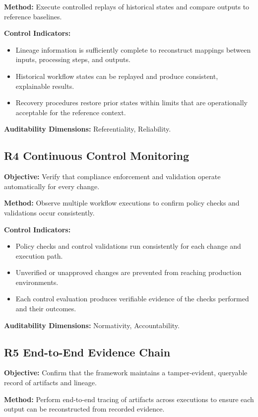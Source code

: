 \textbf{Method:} Execute controlled replays of historical states and compare
outputs to reference baselines.  

\textbf{Control Indicators:}
\begin{itemize}
  \item Lineage information is sufficiently complete to reconstruct mappings
        between inputs, processing steps, and outputs.
  \item Historical workflow states can be replayed and produce consistent,
        explainable results.
  \item Recovery procedures restore prior states within limits that are
        operationally acceptable for the reference context.
\end{itemize}
\textbf{Auditability Dimensions:} Referentiality, Reliability.

\subsection*{R4 Continuous Control Monitoring}
\noindent
\textbf{Objective:} Verify that compliance enforcement and validation operate
automatically for every change.  

\textbf{Method:} Observe multiple workflow executions to confirm policy checks
and validations occur consistently.  

\textbf{Control Indicators:}
\begin{itemize}
  \item Policy checks and control validations run consistently for each change
        and execution path.
  \item Unverified or unapproved changes are prevented from reaching production
        environments.
  \item Each control evaluation produces verifiable evidence of the checks
        performed and their outcomes.
\end{itemize}
\textbf{Auditability Dimensions:} Normativity, Accountability.

\subsection*{R5 End-to-End Evidence Chain}
\noindent
\textbf{Objective:} Confirm that the framework maintains a tamper-evident,
queryable record of artifacts and lineage.  

\textbf{Method:} Perform end-to-end tracing of artifacts across executions to
ensure each output can be reconstructed from recorded evidence.  

